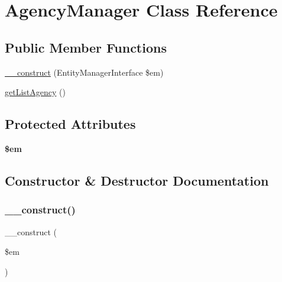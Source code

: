 \hypertarget{class_app_1_1_b_l_1_1_agency_manager}{}\section{Agency\+Manager Class Reference}
\label{class_app_1_1_b_l_1_1_agency_manager}
\subsection*{Public Member Functions}
\begin{DoxyCompactItemize}
\item 
\mbox{\hyperlink{class_app_1_1_b_l_1_1_agency_manager_a25f4258aeb5ce2a61a2504cb7c058485}{\+\_\+\+\_\+construct}} (Entity\+Manager\+Interface \$em)
\item 
\mbox{\hyperlink{class_app_1_1_b_l_1_1_agency_manager_a669c4f12e1952c49805cc42da3aecb9b}{get\+List\+Agency}} ()
\end{DoxyCompactItemize}
\subsection*{Protected Attributes}
\begin{DoxyCompactItemize}
\item 
\mbox{\label{class_app_1_1_b_l_1_1_agency_manager_a0f2991d5fed029ef50ef619f1a532d06}} 
{\bfseries \$em}
\end{DoxyCompactItemize}


\subsection{Constructor \& Destructor Documentation}
\mbox{\label{class_app_1_1_b_l_1_1_agency_manager_a25f4258aeb5ce2a61a2504cb7c058485}} 
\subsubsection{\texorpdfstring{\_\_construct()}{\_\_construct()}}
{\footnotesize\ttfamily \+\_\+\+\_\+construct (\begin{DoxyParamCaption}\item[{Entity\+Manager\+Interface}]{\$em }\end{DoxyParamCaption})}


